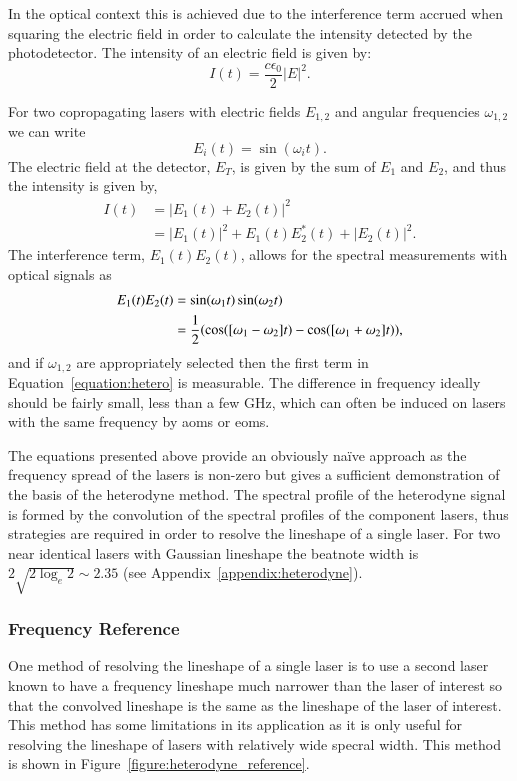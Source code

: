 In the optical context this is achieved due to the interference term accrued when squaring the electric field in order to calculate the intensity detected by the photodetector. The intensity of an electric field is given by:
\begin{equation}
I(t) = \frac{c\epsilon_0}{2}|E|^2.
\end{equation}

For two copropagating lasers with electric fields $E_{1, 2}$ and angular frequencies $\omega_{1, 2}$ we can write
\begin{equation}
E_{i}(t) = \sin(\omega_{i}t).
\end{equation}
The electric field at the detector, $E_T$, is given by the sum of $E_{1}$ and $E_{2}$, and thus the intensity is given by,
\begin{align}
I(t) &= |E_1(t) + E_2(t)|^2\nonumber\\
&= |E_1(t)|^2 + E_1(t)E_2^*(t) + |E_2(t)|^2.
\end{align}
The interference term, $E_1(t)E_2(t)$, allows for the spectral measurements with optical signals as
\begin{align}
E_1(t)E_2(t) &= \sin(\omega_1 t) \sin(\omega_2 t) \notag \\
&= \frac{1}{2} (\cos([\omega_1-\omega_2]t) - \cos([\omega_1+\omega_2]t)), \label{equation:hetero}
\end{align}
and if $\omega_{1,2}$ are appropriately selected then the first term in Equation~\ref{equation:hetero} is measurable.
The difference in frequency ideally should be fairly small, less than a few GHz, which can often be induced on lasers with the same frequency by \glspl{aom} or \glspl{eom}.

The equations presented above provide an obviously na\"ive approach as the frequency spread of the lasers is non-zero but gives a sufficient demonstration of the basis of the heterodyne method.
The spectral profile of the heterodyne signal is formed by the convolution of the spectral profiles of the component lasers, thus strategies are required in order to resolve the lineshape of a single laser.
For two near identical lasers with Gaussian lineshape the beatnote width is $2\sqrt{2\log_e2}\sim2.35$ (see Appendix~\ref{appendix:heterodyne}).

\subsubsection{Frequency Reference}
One method of resolving the lineshape of a single laser is to use a second laser known to have a frequency lineshape much narrower than the laser of interest so that the convolved lineshape is the same as the lineshape of the laser of interest.
This method has some limitations in its application as it is only useful for resolving the lineshape of lasers with relatively wide specral width.
This method is shown in Figure~\ref{figure:heterodyne_reference}.

